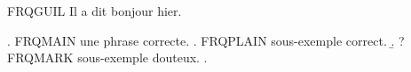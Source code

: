 

FRQGUIL Il a dit \og bonjour \fg{} hier.

\ex. FRQMAIN une phrase correcte.
\a. FRQPLAIN sous-exemple correct.
\b. ?FRQMARK sous-exemple douteux.
\z.

